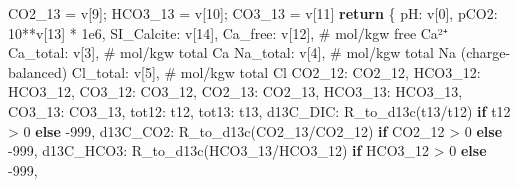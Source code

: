 \documentclass[
  letterpaper,
  DIV=11,
  numbers=noendperiod]{scrartcl}
\newenvironment{Shaded}{\begin{snugshade}}{\end{snugshade}}
\newcommand{\CommentTok}[1]{\textcolor[rgb]{0.37,0.37,0.37}{#1}}
\newcommand{\ControlFlowTok}[1]{\textcolor[rgb]{0.00,0.23,0.31}{\textbf{#1}}}
\newcommand{\DecValTok}[1]{\textcolor[rgb]{0.68,0.00,0.00}{#1}}
\newcommand{\FloatTok}[1]{\textcolor[rgb]{0.68,0.00,0.00}{#1}}
\newcommand{\NormalTok}[1]{\textcolor[rgb]{0.00,0.23,0.31}{#1}}
\newcommand{\OperatorTok}[1]{\textcolor[rgb]{0.37,0.37,0.37}{#1}}
\newcommand{\StringTok}[1]{\textcolor[rgb]{0.13,0.47,0.30}{#1}}
\begin{document}
\begin{Shaded}
\begin{Highlighting}[]
\NormalTok{    CO2\_13 }\OperatorTok{=}\NormalTok{ v[}\DecValTok{9}\NormalTok{]}\OperatorTok{;}\NormalTok{ HCO3\_13 }\OperatorTok{=}\NormalTok{ v[}\DecValTok{10}\NormalTok{]}\OperatorTok{;}\NormalTok{ CO3\_13 }\OperatorTok{=}\NormalTok{ v[}\DecValTok{11}\NormalTok{]}
    \ControlFlowTok{return}\NormalTok{ \{}
        \StringTok{\textquotesingle{}pH\textquotesingle{}}\NormalTok{: v[}\DecValTok{0}\NormalTok{],}
        \StringTok{\textquotesingle{}pCO2\textquotesingle{}}\NormalTok{: }\DecValTok{10}\OperatorTok{**}\NormalTok{v[}\DecValTok{13}\NormalTok{] }\OperatorTok{*} \FloatTok{1e6}\NormalTok{,}
        \StringTok{\textquotesingle{}SI\_Calcite\textquotesingle{}}\NormalTok{: v[}\DecValTok{14}\NormalTok{],}
        \StringTok{\textquotesingle{}Ca\_free\textquotesingle{}}\NormalTok{: v[}\DecValTok{12}\NormalTok{],      }\CommentTok{\# mol/kgw free Ca²⁺}
        \StringTok{\textquotesingle{}Ca\_total\textquotesingle{}}\NormalTok{: v[}\DecValTok{3}\NormalTok{],      }\CommentTok{\# mol/kgw total Ca}
        \StringTok{\textquotesingle{}Na\_total\textquotesingle{}}\NormalTok{: v[}\DecValTok{4}\NormalTok{],      }\CommentTok{\# mol/kgw total Na (charge{-}balanced)}
        \StringTok{\textquotesingle{}Cl\_total\textquotesingle{}}\NormalTok{: v[}\DecValTok{5}\NormalTok{],      }\CommentTok{\# mol/kgw total Cl}
        \StringTok{\textquotesingle{}CO2\_12\textquotesingle{}}\NormalTok{: CO2\_12, }\StringTok{\textquotesingle{}HCO3\_12\textquotesingle{}}\NormalTok{: HCO3\_12, }\StringTok{\textquotesingle{}CO3\_12\textquotesingle{}}\NormalTok{: CO3\_12,}
        \StringTok{\textquotesingle{}CO2\_13\textquotesingle{}}\NormalTok{: CO2\_13, }\StringTok{\textquotesingle{}HCO3\_13\textquotesingle{}}\NormalTok{: HCO3\_13, }\StringTok{\textquotesingle{}CO3\_13\textquotesingle{}}\NormalTok{: CO3\_13,}
        \StringTok{\textquotesingle{}tot12\textquotesingle{}}\NormalTok{: t12, }\StringTok{\textquotesingle{}tot13\textquotesingle{}}\NormalTok{: t13,}
        \StringTok{\textquotesingle{}d13C\_DIC\textquotesingle{}}\NormalTok{:  R\_to\_d13c(t13}\OperatorTok{/}\NormalTok{t12) }\ControlFlowTok{if}\NormalTok{ t12 }\OperatorTok{\textgreater{}} \DecValTok{0} \ControlFlowTok{else} \OperatorTok{{-}}\DecValTok{999}\NormalTok{,}
        \StringTok{\textquotesingle{}d13C\_CO2\textquotesingle{}}\NormalTok{:  R\_to\_d13c(CO2\_13}\OperatorTok{/}\NormalTok{CO2\_12) }\ControlFlowTok{if}\NormalTok{ CO2\_12 }\OperatorTok{\textgreater{}} \DecValTok{0} \ControlFlowTok{else} \OperatorTok{{-}}\DecValTok{999}\NormalTok{,}
        \StringTok{\textquotesingle{}d13C\_HCO3\textquotesingle{}}\NormalTok{: R\_to\_d13c(HCO3\_13}\OperatorTok{/}\NormalTok{HCO3\_12) }\ControlFlowTok{if}\NormalTok{ HCO3\_12 }\OperatorTok{\textgreater{}} \DecValTok{0} \ControlFlowTok{else} \OperatorTok{{-}}\DecValTok{999}\NormalTok{,}

\end{Highlighting}
\end{Shaded}
\end{document}
